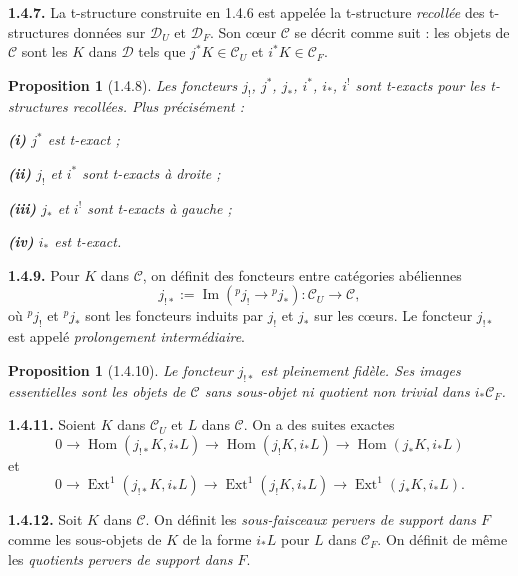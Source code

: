\documentclass[12pt,a4paper]{article}
\theoremstyle{plain}
\newtheorem{proposition}[theorem]{Proposition}
\theoremstyle{definition}
\theoremstyle{remark}
\DeclareMathOperator{\Hom}{Hom}
\DeclareMathOperator{\Ext}{Ext}
\DeclareMathOperator{\pIm}{Im}
\newcommand{\cC}{\mathcal{C}}
\newcommand{\cD}{\mathcal{D}}
\begin{document}
\noindent
\textbf{1.4.7.} La t-structure construite en 1.4.6 est appelée la t-structure \emph{recollée} des t-structures données sur $\cD_{U}$ et $\cD_{F}$. Son cœur $\cC$ se décrit comme suit : les objets de $\cC$ sont les $K$ dans $\cD$ tels que $j^{*}K \in \cC_{U}$ et $i^{*}K \in \cC_{F}$.

\smallskip

\begin{proposition}[1.4.8]
Les foncteurs $j_{!}$, $j^{*}$, $j_{*}$, $i^{*}$, $i_{*}$, $i^{!}$ sont t-exacts pour les t-structures recollées. Plus précisément :

\smallskip

\noindent
\textbf{(i)} $j^{*}$ est t-exact ;

\noindent
\textbf{(ii)} $j_{!}$ et $i^{*}$ sont t-exacts à droite ;

\noindent
\textbf{(iii)} $j_{*}$ et $i^{!}$ sont t-exacts à gauche ;

\noindent
\textbf{(iv)} $i_{*}$ est t-exact.
\end{proposition}

\smallskip

\noindent
\textbf{1.4.9.} Pour $K$ dans $\cC$, on définit des foncteurs entre catégories abéliennes
\[
j_{!*} := \pIm({}^{p}j_{!} \to {}^{p}j_{*}) : \cC_{U} \to \cC,
\]
où ${}^{p}j_{!}$ et ${}^{p}j_{*}$ sont les foncteurs induits par $j_{!}$ et $j_{*}$ sur les cœurs. Le foncteur $j_{!*}$ est appelé \emph{prolongement intermédiaire}.

\smallskip

\begin{proposition}[1.4.10]
Le foncteur $j_{!*}$ est pleinement fidèle. Ses images essentielles sont les objets de $\cC$ sans sous-objet ni quotient non trivial dans $i_{*}\cC_{F}$.
\end{proposition}

\smallskip

\noindent
\textbf{1.4.11.} Soient $K$ dans $\cC_{U}$ et $L$ dans $\cC$. On a des suites exactes
\[
0 \to \Hom(j_{!*}K, i_{*}L) \to \Hom(j_{!}K, i_{*}L) \to \Hom(j_{*}K, i_{*}L)
\]
et
\[
0 \to \Ext^{1}(j_{!*}K, i_{*}L) \to \Ext^{1}(j_{!}K, i_{*}L) \to \Ext^{1}(j_{*}K, i_{*}L).
\]

\smallskip

\noindent
\textbf{1.4.12.} Soit $K$ dans $\cC$. On définit les \emph{sous-faisceaux pervers de support dans $F$} comme les sous-objets de $K$ de la forme $i_{*}L$ pour $L$ dans $\cC_{F}$. On définit de même les \emph{quotients pervers de support dans $F$}.
\end{document}
